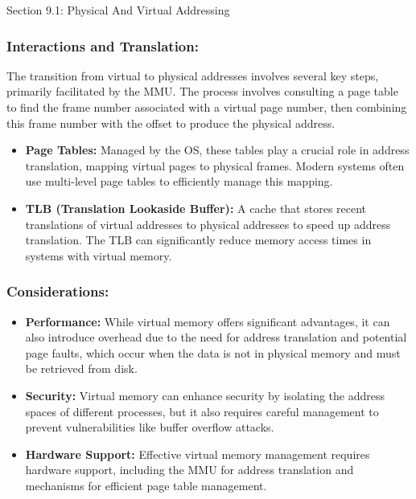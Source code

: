 \begin{notes}{Section 9.1: Physical And Virtual Addressing}
    \subsubsection*{Interactions and Translation:}

    The transition from virtual to physical addresses involves several key steps, primarily facilitated by the MMU. The process involves consulting a page table to find the frame number associated 
    with a virtual page number, then combining this frame number with the offset to produce the physical address.
    
    \begin{itemize}
        \item \textbf{Page Tables:} Managed by the OS, these tables play a crucial role in address translation, mapping virtual pages to physical frames. Modern systems often use multi-level page 
        tables to efficiently manage this mapping.
        \item \textbf{TLB (Translation Lookaside Buffer):} A cache that stores recent translations of virtual addresses to physical addresses to speed up address translation. The TLB can significantly 
        reduce memory access times in systems with virtual memory.
    \end{itemize}
    
    \subsubsection*{Considerations:}
    
    \begin{itemize}
        \item \textbf{Performance:} While virtual memory offers significant advantages, it can also introduce overhead due to the need for address translation and potential page faults, which occur 
        when the data is not in physical memory and must be retrieved from disk.
        \item \textbf{Security:} Virtual memory can enhance security by isolating the address spaces of different processes, but it also requires careful management to prevent vulnerabilities like 
        buffer overflow attacks.
        \item \textbf{Hardware Support:} Effective virtual memory management requires hardware support, including the MMU for address translation and mechanisms for efficient page table management.
    \end{itemize}    
\end{notes}

